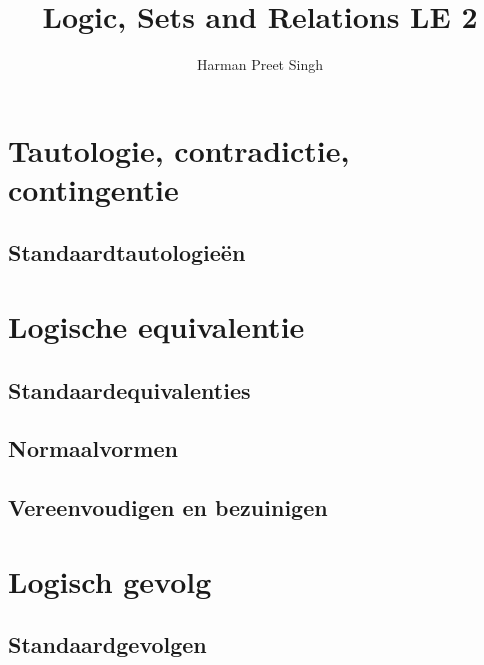 \documentclass[a4paper, 12pt]{article}
\title{Logic, Sets and Relations \textemdash{} LE 2}
\author{Harman Preet Singh}
\begin{document}

\maketitle
\tableofcontents

\section{Tautologie, contradictie, contingentie}
\subsection{Standaardtautologieën}

\section{Logische equivalentie}
\subsection{Standaardequivalenties}
\subsection{Normaalvormen}
\subsection{Vereenvoudigen en bezuinigen}

\section{Logisch gevolg}
\subsection{Standaardgevolgen}
\end{document}
